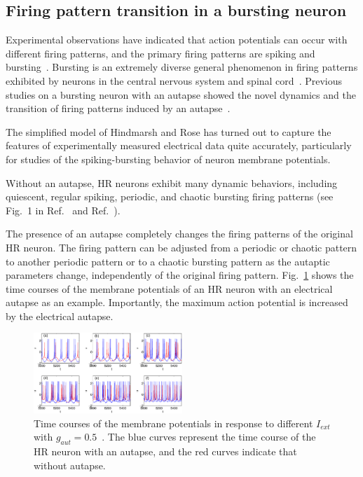 \documentclass[twocolumn,showpacs,preprintnumbers,amsmath,amssymb,pre,superscriptaddress]{revtex4-1}
\begin{document}
\begin{CJK}{UTF8}{gbsn}
\section{Firing pattern transition in a bursting neuron}
%

Experimental observations have indicated that action potentials can occur with different firing patterns, and the primary firing patterns are spiking and bursting~\cite{cocatre,mainen,izikevich2000,kepecs2002,guhuaguang,yuht}. Bursting is an extremely diverse general phenomenon in firing patterns exhibited by neurons in the central nervous system and spinal cord~\cite{wagenaar, wangj}. Previous studies on a bursting neuron with an autapse showed the novel dynamics and the transition of firing patterns induced by an autapse~\cite{wht2014a}.


The simplified model of Hindmarsh and Rose has turned out to capture the features of experimentally measured electrical data quite accurately, particularly for studies of the spiking-bursting behavior of neuron membrane potentials. 

Without an autapse, HR neurons exhibit many dynamic behaviors, including quiescent, regular spiking, periodic, and chaotic bursting firing patterns (see Fig.~1 in Ref.~\cite{wht2014a} and Ref.~\cite{tang}).


The presence of an autapse completely changes the firing patterns of the original HR neuron. The firing pattern can be adjusted from a periodic or chaotic pattern to another periodic pattern or to a chaotic bursting pattern as the autaptic parameters change, independently of the original firing pattern. Fig.~\ref{fig3_hr_e1} shows the time courses of the membrane potentials of an HR neuron with an electrical autapse as an example. Importantly, the maximum action potential is increased by the electrical autapse. 
\begin{figure}
\begin{center}
\includegraphics[width=0.5\textwidth]{fig3_electrical_all_v.eps}
\end{center}
\caption{Time courses of the membrane potentials in response to different $I_{ext}$ with $g_{aut}=0.5$~\cite{wht2014a}. The blue curves represent the time course of the HR neuron with an autapse, and the red curves indicate that without autapse.}
\label{fig3_hr_e1}
\end{figure}


\end{CJK}
\end{document}
